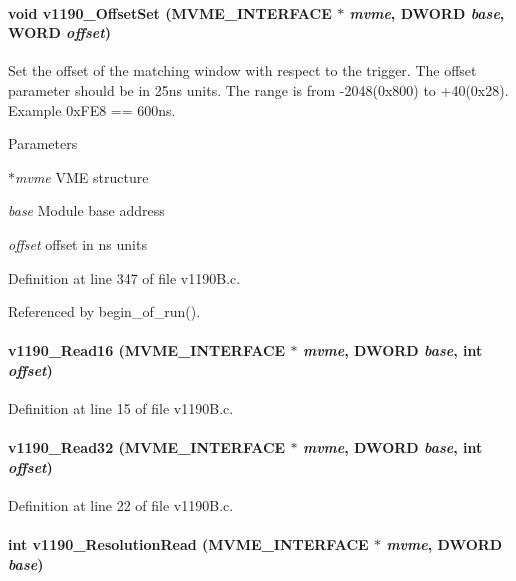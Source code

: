 \paragraph[{v1190\_\-OffsetSet}]{\setlength{\rightskip}{0pt plus 5cm}void v1190\_\-OffsetSet ({\bf MVME\_\-INTERFACE} $\ast$ {\em mvme}, \/  {\bf DWORD} {\em base}, \/  {\bf WORD} {\em offset})}\hfill\label{v1190B_8c_a47b04f666b0640f4ec4b5b03a78bcff5}
Set the offset of the matching window with respect to the trigger. The offset parameter should be in 25ns units. The range is from -\/2048(0x800) to +40(0x28). Example 0xFE8 == 600ns. 
\begin{DoxyParams}{Parameters}
\item[{\em $\ast$mvme}]VME structure \item[{\em base}]Module base address \item[{\em offset}]offset in ns units \end{DoxyParams}


Definition at line 347 of file v1190B.c.

Referenced by begin\_\-of\_\-run().
\paragraph[{v1190\_\-Read16}]{ v1190\_\-Read16 ({\bf MVME\_\-INTERFACE} $\ast$ {\em mvme}, \/  {\bf DWORD} {\em base}, \/  int {\em offset})}\hfill\label{v1190B_8c_a9e84eeda088ad0164da8f86fa37801fb}


Definition at line 15 of file v1190B.c.
\paragraph[{v1190\_\-Read32}]{ v1190\_\-Read32 ({\bf MVME\_\-INTERFACE} $\ast$ {\em mvme}, \/  {\bf DWORD} {\em base}, \/  int {\em offset})}\hfill\label{v1190B_8c_a726bf5ad9a4996c0b8980db2ae2452c2}


Definition at line 22 of file v1190B.c.
\paragraph[{v1190\_\-ResolutionRead}]{\setlength{\rightskip}{0pt plus 5cm}int v1190\_\-ResolutionRead ({\bf MVME\_\-INTERFACE} $\ast$ {\em mvme}, \/  {\bf DWORD} {\em base})}\hfill\label{v1190B_8c_ac0e1f3f3142c14efc3aaefe2136b87a0}


